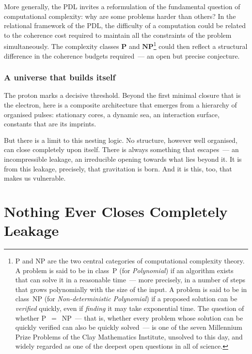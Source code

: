 \documentclass[12pt, a4paper, openright]{book}
\begin{document}
More generally, the PDL invites a reformulation of the fundamental question of computational complexity: why are some problems harder than others? In the relational framework of the PDL, the difficulty of a computation could be related to the coherence cost required to maintain all the constraints of the problem simultaneously. The complexity classes $\mathbf{P}$ and $\mathbf{NP}$\footnote{P and NP are the two central categories of computational complexity theory. A problem is said to be in class~P (for \textit{Polynomial}) if an algorithm exists that can solve it in a reasonable time~--- more precisely, in a number of steps that grows polynomially with the size of the input. A problem is said to be in class~NP (for \textit{Non-deterministic Polynomial}) if a proposed solution can be \emph{verified} quickly, even if \emph{finding} it may take exponential time. The question of whether P~$=$~NP~--- that is, whether every problem whose solution can be quickly verified can also be quickly solved~--- is one of the seven Millennium Prize Problems of the Clay Mathematics Institute, unsolved to this day, and widely regarded as one of the deepest open questions in all of science.} could then reflect a structural difference in the coherence budgets required~--- an open but precise conjecture.

\subsection*{A universe that builds itself}

The proton marks a decisive threshold. Beyond the first minimal closure that is the electron, here is a composite architecture that emerges from a hierarchy of organised pulses: stationary cores, a dynamic sea, an interaction surface, constants that are its imprints.

\medskip

But there is a limit to this nesting logic. No structure, however well organised, can close completely upon itself. There is always something that escapes~--- an incompressible leakage, an irreducible opening towards what lies beyond it. It is from this leakage, precisely, that gravitation is born. And it is this, too, that makes us vulnerable.

\chapter[Nothing Ever Closes Completely --- Leakage]{Nothing Ever Closes Completely \\ Leakage}
\end{document}

